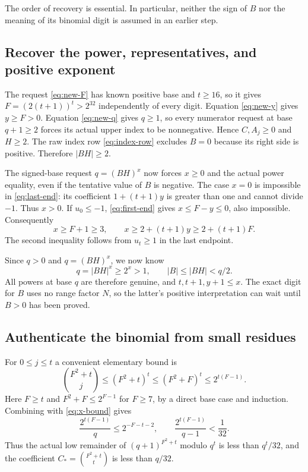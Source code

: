 \documentclass[11pt]{article}
\theoremstyle{definition}
\begin{document}
The order of recovery is essential. In particular, neither the sign of
$B$ nor the meaning of its binomial digit is assumed in an earlier step.

\subsection{Recover the power, representatives, and positive exponent}

The request \eqref{eq:new-F} has known positive base and $t\ge16$, so
it gives
$F=(2(t+1))^t>2^{32}$ independently of every digit. Equation
\eqref{eq:new-y} gives $y\ge F>0$. Equation \eqref{eq:new-q} gives
$q\ge1$, so every numerator request at base $q+1\ge2$ forces its
actual upper index to be nonnegative. Hence $C,A_j\ge0$ and $H\ge2$.
The raw index row \eqref{eq:index-row} excludes $B=0$ because its
right side is positive. Therefore $|BH|\ge2$.

The signed-base request $q=(BH)^x$ now forces $x\ge0$ and the actual
power equality, even if the tentative value of $B$ is negative. The case
$x=0$ is impossible in \eqref{eq:last-end}: its coefficient
$1+(t+1)y$ is greater than one and cannot divide $-1$. Thus $x>0$.
If $u_0\le-1$, \eqref{eq:first-end} gives
$x\le F-y\le0$, also impossible. Consequently
\begin{equation}\label{eq:x-bound}
             x\ge F+1\ge3,
       \qquad x\ge2+(t+1)y\ge2+(t+1)F.
\end{equation}
The second inequality follows from $u_t\ge1$ in the last endpoint.

Since $q>0$ and $q=(BH)^x$, we now know
\begin{equation}\label{eq:q-growth}
 q=|BH|^x\ge2^x>1,\qquad |B|\le |BH|<q/2.
\end{equation}
All powers at base $q$ are therefore genuine, and $t,t+1,y+1\le x$.
The exact digit for $B$ uses no range factor $N$, so the latter's positive
interpretation can wait until $B>0$ has been proved.

\subsection{Authenticate the binomial from small residues}

For $0\le j\le t$ a convenient elementary bound is
\[
 \binom{F^2+t}{j}\le(F^2+t)^t\le(F^2+F)^t
                         \le2^{t(F-1)}.
\]
Here $F\ge t$ and $F^2+F\le2^{F-1}$ for $F\ge7$, by a direct
base case and induction. Combining with \eqref{eq:x-bound} gives
\[
 \frac{2^{t(F-1)}}{q}\le2^{-F-t-2},\qquad
 \frac{2^{t(F-1)}}{q-1}<\frac1{32}.
\]
Thus the actual low remainder of $(q+1)^{F^2+t}$ modulo $q^t$ is
less than $q^t/32$, and the coefficient
$C_* = \binom{F^2+t}{t}$ is less than $q/32$.
\end{document}
